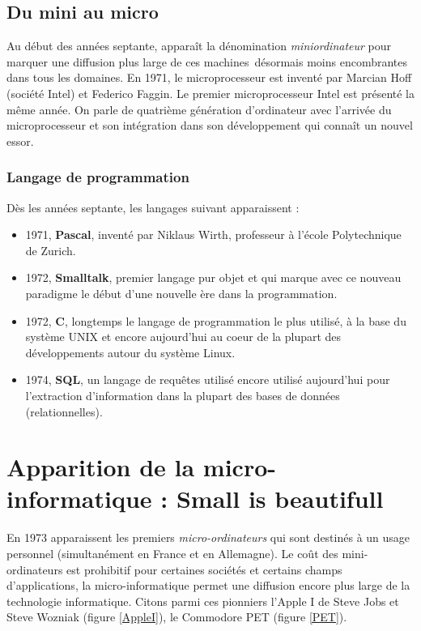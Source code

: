 \documentclass[a4paper,11pt]{book}
\begin{document}
\subsection{Du mini au micro}
Au début des années septante, apparaît la dénomination \textit{miniordinateur} pour marquer une diffusion plus large de ces \guillemotleft machines\guillemotright~désormais moins encombrantes dans tous les domaines.
En 1971, le microprocesseur est inventé par Marcian Hoff (société Intel) et Federico Faggin. Le premier microprocesseur Intel est présenté la même année. On parle de quatrième génération d'ordinateur avec l'arrivée du microprocesseur et son intégration dans son développement qui connaît un nouvel essor.


\subsubsection{Langage de programmation}
Dès les années septante, les langages suivant apparaissent :
\begin{itemize}
    \item 1971, \textbf{Pascal}, inventé par Niklaus Wirth, professeur à l'école Polytechnique de Zurich.
    \item 1972, \textbf{Smalltalk}, premier langage pur objet et qui marque avec ce nouveau paradigme le début d'une nouvelle ère dans la programmation.
    \item 1972, \textbf{C}, longtemps le langage de programmation le plus utilisé, à la base du système UNIX et encore aujourd'hui au coeur de la plupart des développements autour du système Linux.
    \item 1974, \textbf{SQL}, un langage de requêtes utilisé encore utilisé aujourd'hui pour l'extraction d'information dans la plupart des bases de données (relationnelles).
\end{itemize}

\section{Apparition de la micro-informatique : \guillemotleft Small is beautifull\guillemotright}
En 1973 apparaissent les premiers \textit{micro-ordinateurs} qui sont destinés à un usage personnel (simultanément en France et en Allemagne). Le coût des mini-ordinateurs est prohibitif pour certaines sociétés et certains champs d'applications, la micro-informatique permet une diffusion encore plus large de la technologie informatique. Citons parmi ces pionniers l'Apple I de Steve Jobs et Steve Wozniak (figure \ref{AppleI}), le Commodore PET (figure \ref{PET}).
\end{document}
